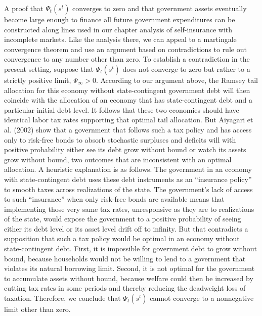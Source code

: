 A proof that $\Psi_t(s^t)$  converges to zero and that government
assets eventually  become large enough to finance all future government
expenditures %
 can be  constructed along
lines used in our chapter
 analysis of  self-insurance with incomplete markets.
Like the analysis there, we can  appeal to a martingale convergence theorem
and use an argument based on contradictions to rule out
convergence to any number other than zero. To establish a
contradiction in the present setting, suppose that $\Psi_t(s^t)$
does not converge to zero but rather to a strictly positive limit,
$\Psi_\infty > 0$. According to our argument above, the Ramsey
tail allocation for this economy without state-contingent
government debt will then coincide with the allocation of an
economy that has state-contingent debt and a particular initial
debt level. It follows that these two economies should have
identical labor tax rates supporting that optimal tail allocation.
But Aiyagari et al. (2002) show that a government that follows
such a tax policy and has access only to risk-free bonds to absorb
stochastic surpluses and deficits will with positive probability
 either see its debt grow without bound or watch its assets grow without
bound, two outcomes that are  inconsistent with an optimal
allocation. A heuristic explanation is as follows. The
government in an economy with state-contingent debt uses these
debt instruments as an ``insurance policy'' to smooth taxes
across realizations of the state. The government's lack of access to  such
``insurance'' when only risk-free bonds are available
means that implementing those very same tax rates, unresponsive as
they are to realizations of the state, would  expose the
government to a positive probability of seeing either its debt
level or its asset level drift off to infinity. But that
contradicts a supposition that such a tax policy would be optimal
in an economy without state-contingent debt. First, it is
impossible for government debt to grow without bound, because
households would not be willing to lend to a government that
violates its natural borrowing limit. Second, it is not optimal
for the government to accumulate assets without bound, because
welfare could then be increased by cutting tax rates in some
periods and thereby reducing the \newpage \noindent  deadweight loss of
taxation. Therefore, we conclude
that $\Psi_t(s^t)$ cannot converge to a nonnegative limit other
than zero.

